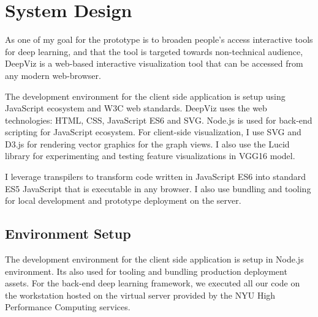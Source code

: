 \section{System Design}

As one of my goal for the prototype is to broaden people's access interactive tools for deep learning, and that the tool is targeted towards non-technical audience, DeepViz is a web-based interactive visualization tool that can be accessed from any modern web-browser. 

The development environment for the client side application is setup using JavaScript ecosystem and W3C web standards. DeepViz uses the web technologies: HTML, CSS, JavaScript ES6 and SVG. Node.js is used for back-end scripting for JavaScript ecosystem. For client-side visualization, I use SVG and D3.js for rendering vector graphics for the graph views. I also use the Lucid library for experimenting and testing feature visualizations in VGG16 model.

I leverage transpilers to transform code written in JavaScript ES6 into standard ES5 JavaScript that is executable in any browser. I also use bundling and tooling for local development and prototype deployment on the server.

\subsection{Environment Setup}

The development environment for the client side application is setup in Node.js environment. Its also used for tooling and bundling production deployment assets. For the back-end deep learning framework, we executed all our code on the workstation hosted on the virtual server provided by the NYU High Performance Computing services. 

